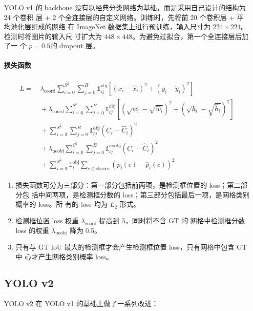 YOLO v1 的 backbone 没有以经典分类网络为基础，而是采用自己设计的结构为 24 个卷积
层 + 2 个全连接层的自定义网络。训练时，先将前 20 个卷积层 + 平均池化层组成的网络
在 ImageNet 数据集上进行预训练，输入尺寸为 $224 \times 224$。检测时将图片的输入尺
寸扩大为 $448 \times 448$。为避免过拟合，第一个全连接层后加了一
个 $p=0.5$的 dropout 层。

\paragraph{损失函数}

\begin{align}
  \label{equ:yolo-v1-loss}
  \begin{split}
    L = & \, \lambda_{\mathrm{coord}} \sum_{i=0}^{S^2} \sum_{j=0}^{B} \mathds{1}_{ij}^{\mathrm{obj}} \left [ \left (x_i - \hat{x}_i \right )^2 + \left (y_i - \hat{y}_i \right )^2 \right ] \\
    & \, + \lambda_{\mathrm{coord}} \sum_{i=0}^{S^2} \sum_{j=0}^{B} \mathds{1}_{ij}^{\mathrm{obj}} \left [ \left(\sqrt{w_i} - \sqrt{\hat{w}_i} \right)^2 + \left (\sqrt{h_i} - \sqrt{\hat{h}_i} \right )^2 \right ]  \\
    & \, + \sum_{i=0}^{S^2} \sum_{j=0}^{B} \mathds{1}_{ij}^{\mathrm{obj}} \left( C_i - \hat{C}_i \right)^2  \\
    & \, + \lambda_{\mathrm{noobj}} \sum_{i=0}^{S^2} \sum_{j=0}^{B} \mathds{1}_{ij}^{\mathrm{noobj}} \left( C_i - \hat{C}_i \right)^2  \\
    & \, + \sum_{i=0}^{S^2} \mathds{1}_{i}^{\mathrm{obj}} \sum_{c \in \mathrm{classes}} \left( p_i(c) - \hat{p}_i(c) \right)^2
  \end{split}
\end{align}

\begin{enumerate}
  \item 损失函数可分为三部分：第一部分包括前两项，是检测框位置的 loss；第二部分包
    括中间两项，是检测框分数的 loss；第三部分包括最后一项，是网格类别概率的 loss。所
    有的 loss 均为 $L_2$ 形式。
  \item 检测框位置 loss 权重 $\lambda_{\mathrm{coord}}$ 提高到 5，同时将不含 GT 的
    网格中检测框分数 loss 的权重 $\lambda_{\mathrm{noobj}}$ 降为 0.5。
  \item 只有与 GT IoU 最大的检测框才会产生检测框位置 loss，只有网格中包含 GT 中
    心才产生网格类别概率 loss。
\end{enumerate}

\subsection{YOLO v2}
\label{subsec:YOLOv2}
YOLO v2 在 YOLO v1 的基础上做了一系列改进：

